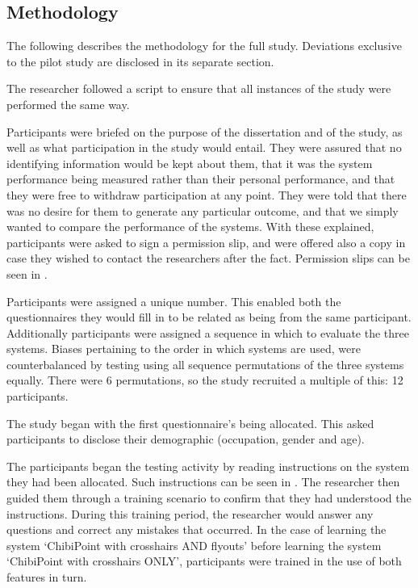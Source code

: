 \documentclass[11pt,openright,a4paper]{report}
\begin{document}
\subsection{Methodology}
The following describes the methodology for the full study. Deviations exclusive to the pilot study are disclosed in its separate section.

The researcher followed a script to ensure that all instances of the study were performed the same way.

Participants were briefed on the purpose of the dissertation and of the study, as well as what participation in the study would entail. They were assured that no identifying information would be kept about them, that it was the system performance being measured rather than their personal performance, and that they were free to withdraw participation at any point. They were told that there was no desire for them to generate any particular outcome, and that we simply wanted to compare the performance of the systems. With these explained, participants were asked to sign a permission slip, and were offered also a copy in case they wished to contact the researchers after the fact. Permission slips can be seen in .

Participants were assigned a unique number. This enabled both the questionnaires they would fill in to be related as being from the same participant. Additionally participants were assigned a sequence in which to evaluate the three systems. Biases pertaining to the order in which systems are used, were counterbalanced by testing using all sequence permutations of the three systems equally. There were 6 permutations, so the study recruited a multiple of this: 12 participants.

The study began with the first questionnaire's being allocated. This asked participants to disclose their demographic (occupation, gender and age).

The participants began the testing activity by reading instructions on the system they had been allocated. Such instructions can be seen in . The researcher then guided them through a training scenario to confirm that they had understood the instructions. During this training period, the researcher would answer any questions and correct any mistakes that occurred. In the case of learning the system `ChibiPoint with crosshairs AND flyouts' before learning the system `ChibiPoint with crosshairs ONLY', participants were trained in the use of both features in turn.
\end{document}

